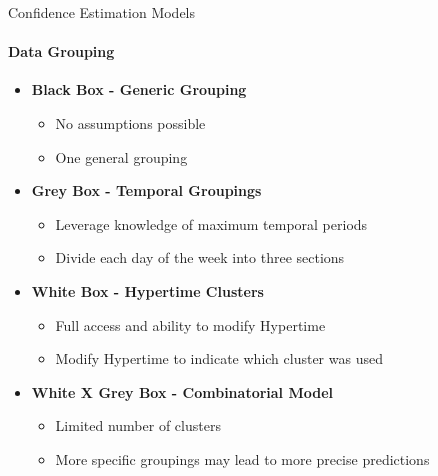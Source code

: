 \documentclass{beamer}
\begin{document}
\begin{frame}[t]{Confidence Estimation Models}
  \framesubtitle{Data Grouping}
  \begin{itemize}
    \setlength\itemsep{1em}
  \item \textbf{Black Box - Generic Grouping}
      \begin{itemize}
        \item No assumptions possible
        \item One general grouping
      \end{itemize}

    \item \textbf{Grey Box - Temporal Groupings}
      \begin{itemize}
        \item Leverage knowledge of maximum temporal periods
        \item Divide each day of the week into three sections
      \end{itemize}

    \item \textbf{White Box - Hypertime Clusters}
      \begin{itemize}
        \item Full access and ability to modify Hypertime
        \item Modify Hypertime to indicate which cluster was used
      \end{itemize}

    \item \textbf{White X Grey Box - Combinatorial Model}
      \begin{itemize}
        \item Limited number of clusters
        \item More specific groupings may lead to more precise predictions
      \end{itemize}

  \end{itemize}
\end{frame}
\end{document}
